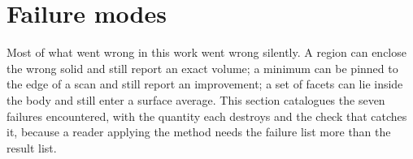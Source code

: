 %
%
%
%

\section{Failure modes}
\label{sec:failures}

Most of what went wrong in this work went wrong silently. A region can
enclose the wrong solid and still report an exact volume; a minimum can be
pinned to the edge of a scan and still report an improvement; a set of
facets can lie inside the body and still enter a surface average. This
section catalogues the seven failures encountered, with the quantity each
destroys and the check that catches it, because a reader applying the
method needs the failure list more than the result list.

